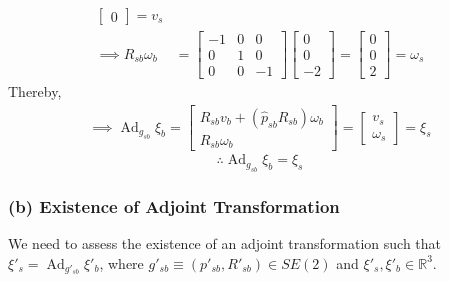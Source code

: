 \begin{align*}
\begin{bmatrix}
        0
    \end{bmatrix}
    =
    v_s
    \\
    \implies
    R_{s b} \omega_b
     & =
    \begin{bmatrix}
        -1 & 0 & 0  \\
        0  & 1 & 0  \\
        0  & 0 & -1
    \end{bmatrix}
    \begin{bmatrix}
        0 \\
        0 \\
        -2
    \end{bmatrix}
    =
    \begin{bmatrix}
        0 \\
        0 \\
        2
    \end{bmatrix}
    =
    \omega_s
\end{align*}
Thereby,
\begin{align*}
    \implies
    \operatorname{Ad}_{g_{s b}} \xi_{b}
    =
    \begin{bmatrix}
        R_{s b} v_b + (\widehat{p}_{s b} R_{s b}) \omega_b \\
        R_{s b} \omega_b
    \end{bmatrix}
    =
    \begin{bmatrix}
        v_s \\
        \omega_s
    \end{bmatrix}
    =
    \xi_s
\end{align*}
\begin{equation*}
    \therefore
    \boxed{
    \operatorname{Ad}_{g_{s b}} \xi_{b}
    =
    \xi_s
    }
\end{equation*}

\subsubsection*{(b) Existence of Adjoint Transformation}

We need to assess the existence of an adjoint transformation such that \( \xi'_s = \operatorname{Ad}_{g'_{s b}} \xi'_b \), where \( g'_{s b} \equiv (p'_{s b}, R'_{s b}) \in SE(2) \) and \( \xi'_s, \xi'_b \in \mathbb{R}^3 \).
